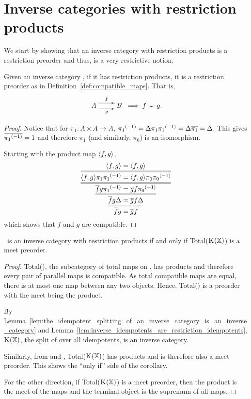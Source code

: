 \section{Inverse categories with restriction products} %
\label{sec:inverse_categories_with_restriction_products}
We start by showing that an inverse category with restriction products is a restriction preorder
and thus, is a very restrictive notion.
\begin{proposition}\label{prop:an_inverse_category_with_products_is_a_restriction_preorder}
  Given an inverse category \X, if it has restriction products, it is a restriction preorder as in
  Definition~\ref{def:compatible_maps}. That is,
  \[
    \xymatrix {
      A  \ar@<1ex>[r]^{f} \ar@<-1ex>[r]_{g} &B
    }
    \implies f \compatible g.
  \]
\end{proposition}
\begin{proof}
  Notice that for $\pi_1:A\times A \to A$, ${\pi_1}^{(-1)}  = \Delta \pi_1 {\pi_1}^{(-1)} =\Delta \overline{\pi_1} = \Delta$.
  This gives $\overline{{\pi_1}^{(-1)}} = 1$ and therefore $\pi_1$ (and similarly, $\pi_0$) is an
  isomorphism.

  Starting with the product map $\langle f,g\rangle$,
  \[
    \infer={\restr{f}g = \restr{g}f}
    {\infer={\restr{f}g\Delta = \restr{g}f\Delta}
    {\infer={\restr{f}g\inv{\pi_1} = \restr{g}f\inv{\pi_0}}
    {\infer={\<f,g\>\pi_1 \inv{\pi_1} = \<f,g\>\pi_0 \inv{\pi_0}}
    {\<f,g\> = \<f,g\>}}}}
  \]
  which shows that $f$ and $g$ are compatible.
\end{proof}

\begin{corollary}
  \X\ is an inverse category with restriction products if and only if Total($\text{K}_{}(\mathbb{X})$) is a meet preorder.
\end{corollary}

\begin{proof}
  Total(\X), the subcategory of total maps on \X, has products and therefore every pair of parallel
  maps is compatible. As total compatible maps are equal, there is at most
  one map between any two objects. Hence, Total(\X) is a preorder with the meet being the product.

  By Lemma~\ref{lem:the_idempotent_splitting_of_an_inverse_category_is_an_inverse_category} and
  Lemma~\ref{lem:inverse_idempotents_are_restriction_idempotents}, $\text{K}_{}(\mathbb{X})$, the split of \X
  over all idempotents, is an inverse category.

  Similarly, from \cite{cockett2002:restcategories1} and \cite{cockettlack2004:restcategories3},
  Total($\text{K}_{}(\mathbb{X})$) has products and is therefore also a meet  preorder. This shows the ``only
  if'' side of the corollary.

  For the other direction, if Total($\text{K}_{}(\mathbb{X})$) is a meet preorder, then the product is the
  meet of the maps and the terminal object is the supremum of all maps.
\end{proof}

